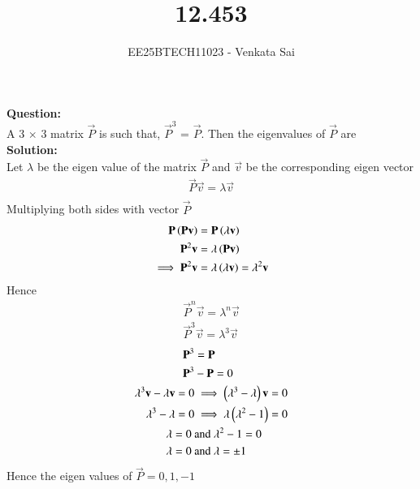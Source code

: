 \documentclass[journal]{IEEEtran}
\begin{document}


\title{12.453}
\author{EE25BTECH11023 - Venkata Sai}
\maketitle
\renewcommand{\thefigure}{\theenumi}
\renewcommand{\thetable}{\theenumi}
\setlength{\intextsep}{10pt} %

\renewcommand{\thetable}{\theenumi}
\vspace{-1em}
\textbf{Question:}  \\
A 3 $\times$ 3 matrix $\vec{P}$ is such that, $\vec{P}^3$ = $\vec{P}$. Then the eigenvalues of $\vec{P}$ are\\
\textbf{Solution:}  \\
 Let $\lambda$ be the eigen value of the matrix $\vec{P}$ and $\vec{v}$ be the corresponding eigen vector
 \begin{align}
     \vec{P}\vec{v}=\lambda\vec{v} \\
 \end{align}
 Multiplying both sides with vector $\vec{P}$
 \begin{align}
     \mathbf{P}\left(\mathbf{P}\mathbf{v}\right)&=\mathbf{P}\left(\lambda\mathbf{v}\right) \\
     \mathbf{P}^{2}\mathbf{v}&=\lambda\left(\mathbf{P}\mathbf{v}\right)\\
     \implies \mathbf{P}^{2}\mathbf{v}&=\lambda\left(\lambda\mathbf{v}\right) =\lambda^2\mathbf{v}
 \end{align}
 Hence
 \begin{align}
     \vec{P}^{n}\vec{v}=\lambda^n\vec{v} \\
     \vec{P}^{3}\vec{v}=\lambda^3\vec{v}
 \end{align}
 \begin{align}
     \mathbf{P}^3&=\mathbf{P} \\
     \mathbf{P}^3&-\mathbf{P}=0 \\
     \lambda^3\mathbf{v}-\lambda\mathbf{v}=0  &\implies \left(\lambda^3-\lambda\right)\mathbf{v}=0 \\
     \lambda^3-\lambda=0 &\implies \lambda\left(\lambda^2-1\right)=0 \\
     \lambda=0\ &\text{and}\ \lambda^2-1=0 \\
     \lambda=0\ &\text{and}\ \lambda=\pm1
 \end{align}
 Hence the eigen values of $\vec{P} = 0,1,-1$
 
\end{document}
